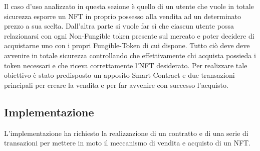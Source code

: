 Il caso d'uso analizzato in questa sezione è quello di un utente che vuole in totale sicurezza esporre un NFT in proprio possesso alla vendita ad un determinato prezzo a sua scelta. Dall'altra parte si vuole far sì che ciascun utente possa relazionarsi con ogni Non-Fungible token presente sul mercato e poter decidere di acquistarne uno con i propri Fungible-Token di cui dispone. Tutto ciò deve deve avvenire in totale sicurezza controllando che effettivamente chi acquista possieda i token necessari e che riceva correttamente l'NFT desiderato. Per realizzare tale obiettivo è stato predisposto un apposito Smart Contract e due transazioni principali per creare la vendita e per far avvenire con successo l'acquisto.
\subsection{Implementazione}
L'implementazione ha richiesto la realizzazione di un contratto  e di una serie di transazioni per mettere in moto il meccanismo di vendita e acquisto di un NFT.
